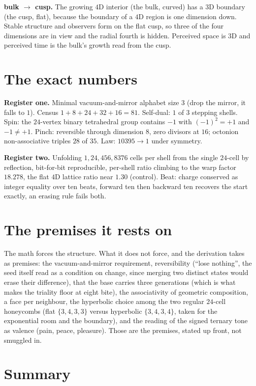 \documentclass{article}
\begin{document}
\textbf{bulk $\to$ cusp.} The growing $4$D interior (the bulk, curved) has a $3$D boundary (the
cusp, flat), because the boundary of a $4$D region is one dimension down. Stable structure and
observers form on the flat cusp, so three of the four dimensions are in view and the radial
fourth is hidden. Perceived space is $3$D and perceived time is the bulk's growth read from the
cusp.

\section{The exact numbers}

\textbf{Register one.} Minimal vacuum-and-mirror alphabet size $3$ (drop the mirror, it falls to
$1$). Census $1{+}8{+}24{+}32{+}16 = 81$. Self-dual: $1$ of $3$ stepping shells. Spin: the
$24$-vertex binary tetrahedral group contains $-1$ with $(-1)^2 = +1$ and $-1 \neq +1$. Pinch:
reversible through dimension $8$, zero divisors at $16$; octonion non-associative triples $28$ of
$35$. Law: $10395 \to 1$ under symmetry.

\textbf{Register two.} Unfolding $1, 24, 456, 8376$ cells per shell from the single $24$-cell by
reflection, bit-for-bit reproducible, per-shell ratio climbing to the warp factor $18.278$, the
flat $4$D lattice ratio near $1.30$ (control). Beat: charge conserved as integer equality over
ten beats, forward ten then backward ten recovers the start exactly, an erasing rule fails both.

\section{The premises it rests on}

The math forces the structure. What it does not force, and the derivation takes as premises: the
vacuum-and-mirror requirement, reversibility (``lose nothing'', the seed itself read as a
condition on change, since merging two distinct states would erase their difference), that the
base carries three generations (which is what makes the triality floor at eight bite), the
associativity of geometric composition, a face per neighbour, the hyperbolic choice among the two
regular $24$-cell honeycombs (flat $\{3,4,3,3\}$ versus hyperbolic $\{3,4,3,4\}$, taken for the
exponential room and the boundary), and the reading of the signed ternary tone as valence (pain,
peace, pleasure). Those are the premises, stated up front, not smuggled in.

\section*{Summary}
\end{document}

